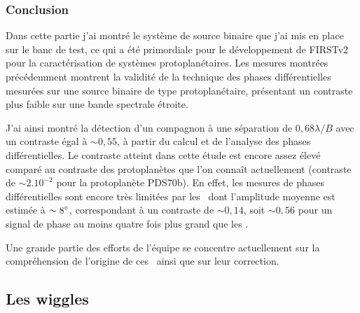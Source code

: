 \begin{figure}[ht!]
    \label{fig:PhaseDiffBin02LikeliMap}
\end{figure}


\subsubsection{Conclusion}

Dans cette partie j'ai montré le système de source binaire que j'ai mis en place sur le banc de test, ce qui a été primordiale pour le développement de \ac{FIRSTv2} pour la caractérisation de systèmes protoplanétaires. Les mesures montrées précédemment montrent la validité de la technique des phases différentielles mesurées sur une source binaire de type protoplanétaire, présentant un contraste plus faible sur une bande spectrale étroite.

J'ai ainsi montré la détection d'un compagnon à une séparation de $0,68 \lambda / B$ avec un contraste égal à $\sim 0,55$, à partir du calcul et de l'analyse des phases différentielles. Le contraste atteint dans cette étude est encore assez élevé comparé au contraste des protoplanètes que l'on connaît actuellement (contraste de $\sim 2.10^{-2}$ pour la protoplanète PDS70b). En effet, les mesures de phases différentielles sont encore très limitées par les \wiggles~dont l'amplitude moyenne est estimée à $\sim 8^{\circ}$, correspondant à un contraste de $\sim 0,14$, soit $\sim 0,56$ pour un signal de phase au moins quatre fois plus grand que les \wiggles.

Une grande partie des efforts de l'équipe se concentre actuellement sur la compréhension de l'origine de ces \wiggles~ainsi que sur leur correction.


\subsection{Les wiggles}
\label{sec:wiggles}


